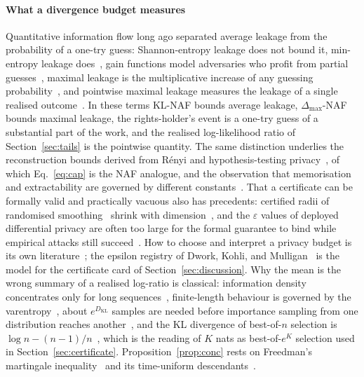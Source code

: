 \paragraph{What a divergence budget measures}
Quantitative information flow long ago separated average leakage from the probability of a one-try guess: Shannon-entropy leakage does not bound it, min-entropy leakage does~\cite{smith2009foundations}, gain functions model adversaries who profit from partial guesses~\cite{alvim2012measuring}, maximal leakage is the multiplicative increase of any guessing probability~\cite{issa2020operational}, and pointwise maximal leakage measures the leakage of a single realised outcome~\cite{saeidian2023pointwise}. In these terms KL-NAF bounds average leakage, $\Delta_{\max}$-NAF bounds maximal leakage, the rights-holder's event is a one-try guess of a substantial part of the work, and the realised log-likelihood ratio of Section~\ref{sec:tails} is the pointwise quantity. The same distinction underlies the reconstruction bounds derived from R\'enyi and hypothesis-testing privacy~\cite{guo2022bounding,balle2022reconstructing,hayes2023bounding,kaissis2023bounding}, of which Eq.~\eqref{eq:cap} is the NAF analogue, and the observation that memorisation and extractability are governed by different constants~\cite{che2026memorization}. That a certificate can be formally valid and practically vacuous also has precedents: certified radii of randomised smoothing~\cite{cohen2019certified} shrink with dimension~\cite{kumar2020curse,blum2020random}, and the $\varepsilon$ values of deployed differential privacy are often too large for the formal guarantee to bind while empirical attacks still succeed~\cite{jayaraman2019evaluating}. How to choose and interpret a privacy budget is its own literature~\cite{lee2011howmuch,hsu2014economic,brown2022privacy,cyffers2025setting}; the epsilon registry of Dwork, Kohli, and Mulligan~\cite{dwork2019expose} is the model for the certificate card of Section~\ref{sec:discussion}. Why the mean is the wrong summary of a realised log-ratio is classical: information density concentrates only for long sequences~\cite{cover2006elements}, finite-length behaviour is governed by the varentropy~\cite{kontoyiannis2014optimal}, about $e^{D_{\mathrm{KL}}}$ samples are needed before importance sampling from one distribution reaches another~\cite{chatterjee2018sample}, and the KL divergence of best-of-$n$ selection is $\log n - (n-1)/n$~\cite{gao2023scaling,beirami2025bestofn}, which is the reading of $K$ nats as best-of-$e^{K}$ selection used in Section~\ref{sec:certificate}. Proposition~\ref{prop:conc} rests on Freedman's martingale inequality~\cite{freedman1975tail,tropp2011freedman} and its time-uniform descendants~\cite{howard2021timeuniform}.

